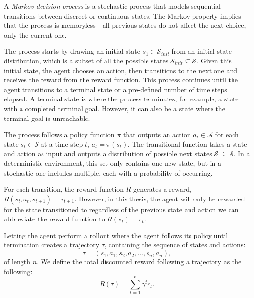 \documentclass[12pt,A4]{report}
\theoremstyle{definition}
\begin{document}
A \textit{Markov decision process} is a stochastic process that models sequential transitions between discreet or continuous states. The Markov property implies that the process is memoryless - all previous states do not affect the next choice, only the current one. 

The process starts by drawing an initial state $s_1 \in \mathcal{S}_{init}$ from an initial state distribution, which is a subset of all the possible states $\mathcal{S}_{init} \subseteq \mathcal{S}$. Given this initial state, the agent chooses an action, then transitions to the next one and receives the reward from the reward function. This process continues until the agent transitions to a terminal state or a pre-defined number of time steps elapsed. A terminal state is where the process terminates, for example, a state with a completed terminal goal. However, it can also be a state where the terminal goal is unreachable.

The process follows a policy function $\pi$ that outputs an action $a_t \in \mathcal{A}$ for each state $s_t \in \mathcal{S}$ at a time step $t$, $a_t = \pi(s_t)$. The transitional function takes a state and action as input and outputs a distribution of possible next states $\mathcal{S}^\prime \subseteq \mathcal{S}$. In a deterministic environment, this set only contains one new state, but in a stochastic one includes multiple, each with a probability of occurring.

For each transition, the reward function $R$  generates a reward, $R(s_t, a_t, s_{t+1}) = r_{t+1}$. However, in this thesis, the agent will only be rewarded for the state transitioned to regardless of the previous state and action we can abbreviate the reward function to $R(s_t) = r_t$.


Letting the agent perform a rollout where the agent follows its policy until termination creates a trajectory $\tau$, containing the sequence of states and actions:
\[ \tau = (s_1, a_1, s_2, a_2, \dots , s_n, a_n),\]
of length $n$. We define the total discounted reward following a trajectory as the following:
\[ R(\tau) = \sum_{t=1}^n \gamma^t r_t.\]
\end{document}
